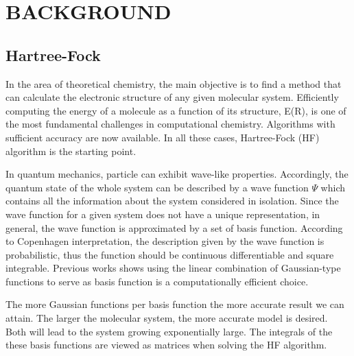 \documentclass[twoside]{article}
\begin{document}

\section{BACKGROUND}

\subsection{Hartree-Fock}



In the area of theoretical chemistry, the main objective is to find a method that can calculate the electronic structure of any given molecular system. Efficiently computing the energy of a molecule as a function of its structure, E(R), is one of the most fundamental challenges in computational chemistry. Algorithms with sufficient accuracy are now available. In all these cases, Hartree-Fock (HF) algorithm is the starting point.

In quantum mechanics, particle can exhibit wave-like properties. Accordingly, the quantum state of the whole system can be described by a wave function $\Psi$ which contains all the information about the system considered in isolation. Since the wave function for a given system does not have a unique representation, in general, the wave function is approximated by a set of basis function. According to Copenhagen interpretation, the description given by the wave function is probabilistic, thus the function should be continuous differentiable and square integrable. Previous works shows using the linear combination of Gaussian-type functions to serve as basis function is a computationally efficient choice.

The more Gaussian functions per basis function the more accurate result we can attain. The larger the molecular system, the more accurate model is desired. Both will lead to the system growing exponentially large. The integrals of the these basis functions are viewed as matrices when solving the HF algorithm.



\end{document}
